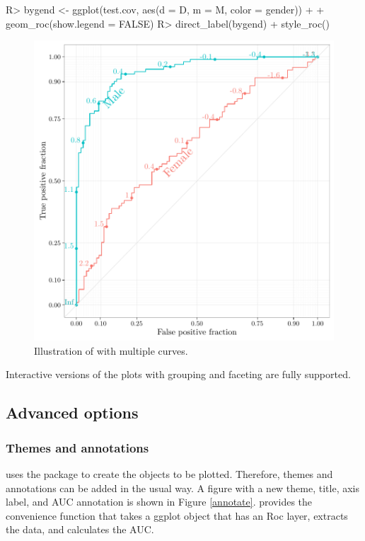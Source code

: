 \documentclass[codesnippet]{jss}
\begin{document}
\begin{Schunk}
\begin{Sinput}
R> bygend <- ggplot(test.cov, aes(d = D, m = M, color = gender)) + 
+   geom_roc(show.legend = FALSE)
R> direct_label(bygend) + style_roc()
\end{Sinput}
\begin{figure}
\includegraphics{figure/covplot-1} \caption{Illustration of  with multiple curves. \label{multi}}\label{fig:covplot}
\end{figure}
\end{Schunk}

Interactive versions of the plots with grouping and faceting are fully
supported.

\subsection{Advanced options}\label{advanced-options}

\subsubsection{Themes and annotations}\label{themes-and-annotations}

 uses the  package to create the objects to be
plotted. Therefore, themes and annotations can be added in the usual
 way. A  figure with a new theme,
title, axis label, and AUC annotation is shown in Figure \ref{annotate}.
 provides the convenience function  that
takes a ggplot object that has an Roc layer, extracts the data, and
calculates the AUC.
\end{document}
